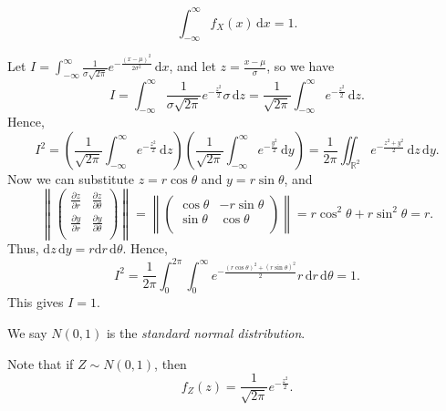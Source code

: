 \begin{claim}
    \[
        \int _{-\infty }^{\infty } f_X(x) \, \mathrm{d} x = 1.  
    \]
\end{claim}
\begin{explanation}
    Let \(I = \int _{-\infty }^{\infty } \frac{1}{\sigma \sqrt{2 \pi } } e^{- \frac{(x - \mu )^2}{2 \sigma ^2}} \, \mathrm{d} x\), and let \(z = \frac{x - \mu}{\sigma }\), so we have 
    \[
        I = \int _{-\infty }^{\infty} \frac{1}{\sigma \sqrt{2\pi } } e^{- \frac{z^2}{2}} \sigma \, \mathrm{d} z = \frac{1}{\sqrt{2\pi } } \int _{-\infty }^{\infty } e^{- \frac{z^2}{2}} \, \mathrm{d} z.  
    \]  
    Hence,
    \[
        I^2 = \left( \frac{1}{\sqrt{2\pi } } \int _{-\infty }^{\infty} e^{- \frac{z^2}{2}} \, \mathrm{d} z  \right) \left( \frac{1}{\sqrt{2\pi } } \int _{-\infty }^{\infty} e^{- \frac{y^2}{2}} \, \mathrm{d} y  \right) = \frac{1}{2\pi } \iint_{\mathbb{R} ^2} e^{- \frac{z^2 + y^2}{2}} \, \mathrm{d} z \, \mathrm{d} y.  
    \]
    Now we can substitute \(z = r \cos \theta \) and \(y = r \sin \theta \), and 
    \[
        \left\lVert \begin{pmatrix}
            \frac{\partial z}{\partial r}  & \frac{\partial z}{\partial \theta}   \\
            \frac{\partial y}{\partial r}  & \frac{\partial y}{\partial \theta}   \\
        \end{pmatrix} \right\rVert = \left\lVert \begin{pmatrix}
            \cos \theta  & -r \sin \theta   \\
            \sin \theta  & \cos \theta  \\
        \end{pmatrix} \right\rVert = r \cos ^2 \theta + r \sin ^2 \theta = r.  
    \]  
    Thus, \(\mathrm{d} z \, \mathrm{d} y = r \mathrm{d} r \, \mathrm{d} \theta    \). Hence,
    \[
        I^2 = \frac{1}{2\pi} \int _0^{2\pi } \int _{0} ^{\infty} e^{-\frac{(r\cos \theta )^2 + (r \sin \theta )^2}{2}} r \, \mathrm{d} r \, \mathrm{d} \theta = 1.   
    \]
    This gives \(I = 1\). 
\end{explanation}

\begin{definition}
    We say \(N(0, 1)\) is the \emph{standard normal distribution}.
\end{definition}

Note that if \(Z \sim N(0, 1)\), then 
\[
    f_Z(z) = \frac{1}{\sqrt{2\pi}} e^{-\frac{z^2}{2}}.
\] 

